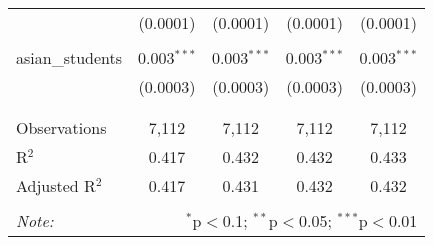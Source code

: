 \begin{table}[!htbp]
\begin{tabular}{@{\extracolsep{-2pt}}lcccc}
  & (0.0001) & (0.0001) & (0.0001) & (0.0001) \\ 
  & & & & \\ 
 asian\_students & 0.003$^{***}$ & 0.003$^{***}$ & 0.003$^{***}$ & 0.003$^{***}$ \\ 
  & (0.0003) & (0.0003) & (0.0003) & (0.0003) \\ 
  & & & & \\ 
\hline \\[-1.8ex] 
Observations & 7,112 & 7,112 & 7,112 & 7,112 \\ 
R$^{2}$ & 0.417 & 0.432 & 0.432 & 0.433 \\ 
Adjusted R$^{2}$ & 0.417 & 0.431 & 0.432 & 0.432 \\ 
\hline 
\hline \\[-1.8ex] 
\textit{Note:}  & \multicolumn{4}{r}{$^{*}$p$<$0.1; $^{**}$p$<$0.05; $^{***}$p$<$0.01} \\ 
\end{tabular} 
\end{table} 
